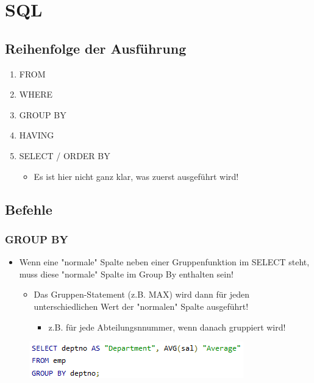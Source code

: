 \section{SQL}
\subsection{Reihenfolge der Ausführung}
\begin{enumerate}
    \item FROM
    \item WHERE
    \item GROUP BY
    \item HAVING
    \item SELECT / ORDER BY
    \begin{itemize}
        \item Es ist hier nicht ganz klar, was zuerst ausgeführt wird!
    \end{itemize}
\end{enumerate}

\subsection{Befehle}
\subsubsection{GROUP BY}
\begin{itemize}
    \item Wenn eine "normale" Spalte neben einer Gruppenfunktion im SELECT steht, muss diese "normale" Spalte im Group By enthalten sein!
    \begin{itemize}
        \item Das Gruppen-Statement (z.B. MAX) wird dann für jeden unterschiedlichen Wert der "normalen" Spalte ausgeführt!
        \begin{itemize}
            \item z.B. für jede Abteilungsnnummer, wenn danach gruppiert wird!
        \end{itemize}
    \end{itemize}
\end{itemize}
\begin{figure}[ht!]
    \centering 
    \includegraphics[]{res/themekorb_2/group_by.png}
\end{figure}

